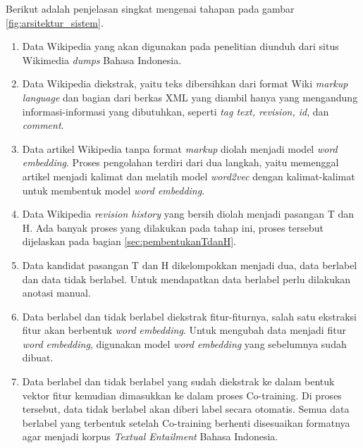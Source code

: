 Berikut adalah penjelasan singkat mengenai tahapan pada gambar \ref{fig:arsitektur_sistem}.
\begin{enumerate}
  \item Data Wikipedia yang akan digunakan pada penelitian diunduh dari situs Wikimedia \textit{dumps} Bahasa Indonesia.
  \item Data Wikipedia diekstrak, yaitu teks dibersihkan dari format Wiki \textit{markup language} dan bagian dari berkas XML yang diambil hanya yang mengandung informasi-informasi yang dibutuhkan, seperti \textit{tag text, revision, id}, dan \textit{comment}.
  \item Data artikel Wikipedia tanpa format \textit{markup} diolah menjadi model \textit{word embedding}. Proses pengolahan terdiri dari dua langkah, yaitu memenggal artikel menjadi kalimat dan melatih model \textit{word2vec} dengan kalimat-kalimat untuk membentuk model \textit{word embedding}.
  \item Data Wikipedia \textit{revision history} yang bersih diolah menjadi pasangan T dan H. Ada banyak proses yang dilakukan pada tahap ini, proses tersebut dijelaskan pada bagian \ref{sec:pembentukanTdanH}.
  \item Data kandidat pasangan T dan H dikelompokkan menjadi dua, data berlabel dan data tidak berlabel. Untuk mendapatkan data berlabel perlu dilakukan anotasi manual. 
  \item Data berlabel dan tidak berlabel diekstrak fitur-fiturnya, salah satu ekstraksi fitur akan berbentuk \textit{word embedding}. Untuk mengubah data menjadi fitur \textit{word embedding}, digunakan model \textit{word embedding} yang sebelumnya sudah dibuat.
  \item Data berlabel dan tidak berlabel yang sudah diekstrak ke dalam bentuk vektor fitur kemudian dimasukkan ke dalam proses Co-training. Di proses tersebut, data tidak berlabel akan diberi label secara otomatis. Semua data berlabel yang terbentuk setelah Co-training berhenti disesuaikan formatnya agar menjadi korpus \textit{Textual Entailment} Bahasa Indonesia.
\end{enumerate}

